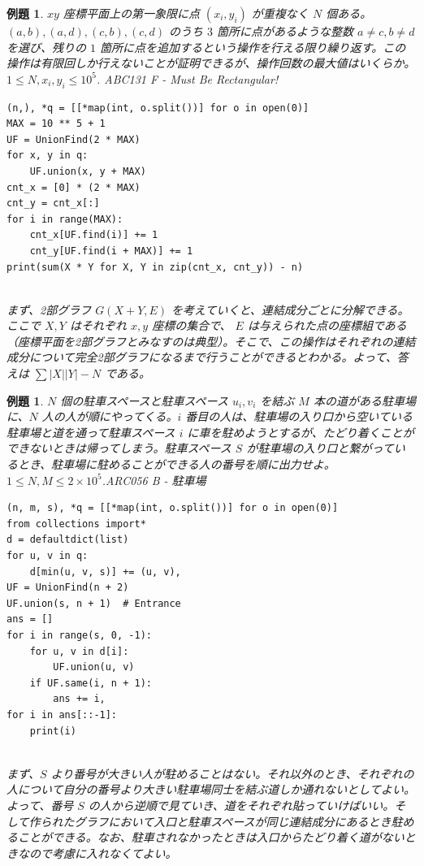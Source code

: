 \documentclass[12pt, a4j]{ltjsarticle}
\newtheorem{exm}[thm]{例題}
\newcommand*{\SS}{\vspace{1cm}}
\begin{document}
\SS

\begin{exm} $xy$ 座標平面上の第一象限に点 $(x_i,y_i)$ が重複なく $N$ 個ある。$(a, b), (a, d), (c, b), (c, d)$ のうち $3$ 箇所に点があるような整数 $a\ne c, b\ne d$ を選び、残りの $1$ 箇所に点を追加するという操作を行える限り繰り返す。この操作は有限回しか行えないことが証明できるが、操作回数の最大値はいくらか。$1\le N,x_i,y_i\le 10^5$. \upshape\quad ABC131 F - Must Be Rectangular!\\
\begin{lstlisting}
(n,), *q = [[*map(int, o.split())] for o in open(0)]
MAX = 10 ** 5 + 1
UF = UnionFind(2 * MAX)
for x, y in q:
    UF.union(x, y + MAX)
cnt_x = [0] * (2 * MAX)
cnt_y = cnt_x[:]
for i in range(MAX):
    cnt_x[UF.find(i)] += 1
    cnt_y[UF.find(i + MAX)] += 1
print(sum(X * Y for X, Y in zip(cnt_x, cnt_y)) - n)
\end{lstlisting}\quad\\
まず、2部グラフ $G(X+Y,E)$ を考えていくと、連結成分ごとに分解できる。ここで $X,Y$ はそれぞれ $x,y$ 座標の集合で、 $E$ は与えられた点の座標組である（座標平面を2部グラフとみなすのは典型）。そこで、この操作はそれぞれの連結成分について完全2部グラフになるまで行うことができるとわかる。よって、答えは $\sum |X||Y| - N$ である。
\end{exm}

\SS

\begin{exm} $N$ 個の駐車スペースと駐車スペース $u_i,v_i$ を結ぶ $M$ 本の道がある駐車場に、$N$ 人の人が順にやってくる。$i$ 番目の人は、駐車場の入り口から空いている駐車場と道を通って駐車スペース $i$ に車を駐めようとするが、たどり着くことができないときは帰ってしまう。駐車スペース $S$ が駐車場の入り口と繋がっているとき、駐車場に駐めることができる人の番号を順に出力せよ。$1\le N,M\le 2\times 10^5$.\quad\upshape ARC056 B - 駐車場\\
\begin{lstlisting}
(n, m, s), *q = [[*map(int, o.split())] for o in open(0)]
from collections import*
d = defaultdict(list)
for u, v in q:
    d[min(u, v, s)] += (u, v),
UF = UnionFind(n + 2)
UF.union(s, n + 1)  # Entrance
ans = []
for i in range(s, 0, -1):
    for u, v in d[i]:
        UF.union(u, v)
    if UF.same(i, n + 1):
        ans += i,
for i in ans[::-1]:
    print(i)
\end{lstlisting}\quad\\
まず、$S$ より番号が大きい人が駐めることはない。それ以外のとき、それぞれの人について自分の番号より大きい駐車場同士を結ぶ道しか通れないとしてよい。よって、番号 $S$ の人から逆順で見ていき、道をそれぞれ貼っていけばいい。そして作られたグラフにおいて入口と駐車スペースが同じ連結成分にあるとき駐めることができる。なお、駐車されなかったときは入口からたどり着く道がないときなので考慮に入れなくてよい。
\end{exm}
\end{document}
